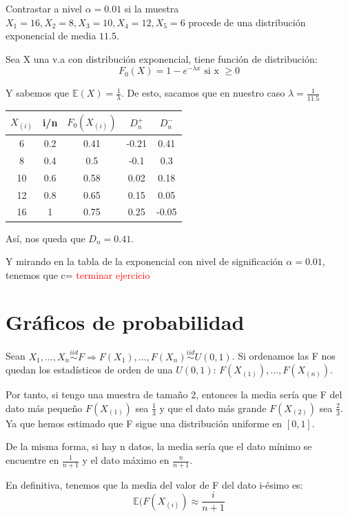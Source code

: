 \documentclass[nochap]{apuntes}
\begin{document}
\begin{example}
Contrastar a nivel $\alpha=0.01$ si la muestra $X_1=16, X_2=8, X_3=10, X_4=12, X_5=6$ procede de una distribución exponencial de media $11.5$.

Sea X una v.a con distribución exponencial, tiene función de distribución:
$$F_0(X) = 1-e^{-\lambda x} \text{ si x } \geq 0$$

Y sabemos que $\mathbb{E}(X)=\frac{1}{\lambda}$. De esto, sacamos que en nuestro caso $\lambda = \frac{1}{11.5}$ 

\begin{tabular}{|c|c|c|c|c|}
\hline
 $X_{(i)}$ & i/n & $F_0(X_{(i)})$ & $D_n^+$ & $D_n^-$ \\
\hline
6 & 0.2 & 0.41 & -0.21 & 0.41 \\
\hline
8 & 0.4 & 0.5 & -0.1 & 0.3 \\
\hline
10 & 0.6 & 0.58 & 0.02 & 0.18 \\
\hline
12 & 0.8 & 0.65 & 0.15 & 0.05 \\
\hline
16 & 1 & 0.75 & 0.25 & -0.05 \\
\hline
\end{tabular}

Así, nos queda que $D_n = 0.41$.

Y mirando en la tabla de la exponencial con nivel de significación $\alpha = 0.01$, tenemos que c= \textcolor{red}{terminar ejercicio}

\end{example}

\section{Gráficos de probabilidad}
Sean $X_1,...,X_n \stackrel{iid}{\sim} F \Rightarrow F(X_1),...,F(X_n) \stackrel{iid}{\sim} U(0,1)$. Si ordenamos las F nos quedan los estadísticos de orden de una $U(0,1)$: $F(X_{(1)}),...,F(X_{(n)})$.

Por tanto, si tengo una muestra de tamaño 2, entonces la media sería que F del dato más pequeño $F(X_{(1)})$ sea $\frac{1}{3}$ y que el dato más grande $F(X_{(2)})$ sea $\frac{2}{3}$. Ya que hemos estimado que F sigue una distribución uniforme en $[0,1]$.

De la misma forma, si hay n datos, la media sería que el dato mínimo se encuentre en $\frac{1}{n+1}$ y el dato máximo en $\frac{n}{n+1}$.

En definitiva, tenemos que la media del valor de F del dato i-ésimo es:
$$\mathbb{E}(F(X_{(i)}) \approx \frac{i}{n+1}$$
\end{document}
